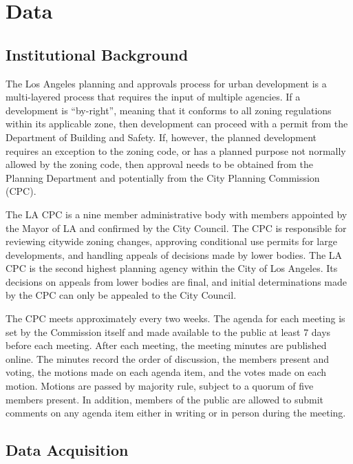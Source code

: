 \section{Data}\label{sec_data}

\subsection{Institutional Background}

The Los Angeles planning and approvals process for urban development is a multi-layered process that requires the input of multiple agencies. If a development is ``by-right'', meaning that it conforms to all zoning regulations within its applicable zone, then development can proceed with a permit from the Department of Building and Safety. If, however, the planned development requires an exception to the zoning code, or has a planned purpose not normally allowed by the zoning code, then approval needs to be obtained from the Planning Department and potentially from the City Planning Commission (CPC).

The LA CPC is a nine member administrative body with members appointed by the Mayor of LA and confirmed by the City Council. The CPC is responsible for reviewing citywide zoning changes, approving conditional use permits for large developments, and handling appeals of decisions made by lower bodies. The LA CPC is the second highest planning agency within the City of Los Angeles. Its decisions on appeals from lower bodies are final, and initial determinations made by the CPC can only be appealed to the City Council.

The CPC meets approximately every two weeks. The agenda for each meeting is set by the Commission itself and made available to the public at least 7 days before each meeting. After each meeting, the meeting minutes are published online. The minutes record the order of discussion, the members present and voting, the motions made on each agenda item, and the votes made on each motion. Motions are passed by majority rule, subject to a quorum of five members present. In addition, members of the public are allowed to submit comments on any agenda item either in writing or in person during the meeting. 

\subsection{Data Acquisition}

